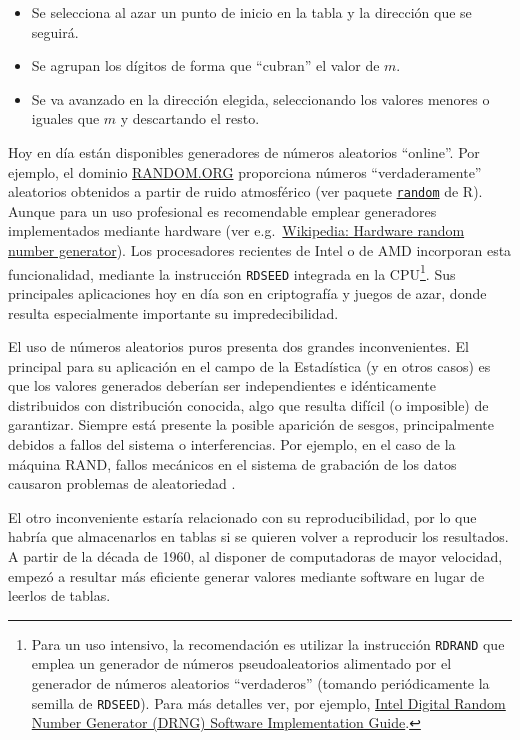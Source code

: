 \documentclass[
  spanish,
  10pt,
]{book}
\theoremstyle{break}
\theoremstyle{nonumberplain}
\let\oldfootnote\footnote
\renewcommand\footnote[1]{\oldfootnote{\hspace{2mm}#1}}
\begin{document}
\begin{itemize}
\item
  Se selecciona al azar un punto de inicio en la tabla
  y la dirección que se seguirá.
\item
  Se agrupan los dígitos de forma que ``cubran'' el valor de \(m\).
\item
  Se va avanzado en la dirección elegida, seleccionando los valores menores o iguales que \(m\) y descartando el resto.
\end{itemize}

Hoy en día están disponibles generadores de números aleatorios ``online''.
Por ejemplo, el dominio \href{http://www.random.org/integers}{RANDOM.ORG} proporciona números ``verdaderamente'' aleatorios obtenidos a partir de ruido atmosférico (ver paquete \href{https://CRAN.R-project.org/package=random}{\texttt{random}} de R).
Aunque para un uso profesional es recomendable emplear generadores implementados mediante hardware (ver e.g.~\href{https://en.wikipedia.org/wiki/Hardware_random_number_generator}{Wikipedia: Hardware random number generator}).
Los procesadores recientes de Intel o de AMD incorporan esta funcionalidad, mediante la instrucción \texttt{RDSEED} integrada en la CPU\footnote{Para un uso intensivo, la recomendación es utilizar la instrucción \texttt{RDRAND} que emplea un generador de números pseudoaleatorios alimentado por el generador de números aleatorios ``verdaderos'' (tomando periódicamente la semilla de \texttt{RDSEED}). Para más detalles ver, por ejemplo, \href{http://software.intel.com/en-us/articles/intel-digital-random-number-generator-drng-software-implementation-guide}{Intel Digital Random Number Generator (DRNG) Software Implementation Guide}.}.
Sus principales aplicaciones hoy en día son en criptografía y juegos de azar, donde resulta especialmente importante su impredecibilidad.

El uso de números aleatorios puros presenta dos grandes inconvenientes.
El principal para su aplicación en el campo de la Estadística (y en otros casos) es que los valores generados deberían ser independientes e idénticamente distribuidos con distribución conocida, algo que resulta difícil (o imposible) de garantizar.
Siempre está presente la posible aparición de sesgos, principalmente debidos a fallos del sistema o interferencias.
Por ejemplo, en el caso de la máquina RAND, fallos mecánicos en el sistema de grabación de los datos causaron problemas de aleatoriedad \citep[p.~118]{hacking1965}.

El otro inconveniente estaría relacionado con su reproducibilidad, por lo que habría que almacenarlos en tablas si se quieren volver a reproducir los resultados.
A partir de la década de 1960, al disponer de computadoras de mayor velocidad, empezó a resultar más eficiente generar valores mediante software en lugar de leerlos de tablas.
\end{document}
